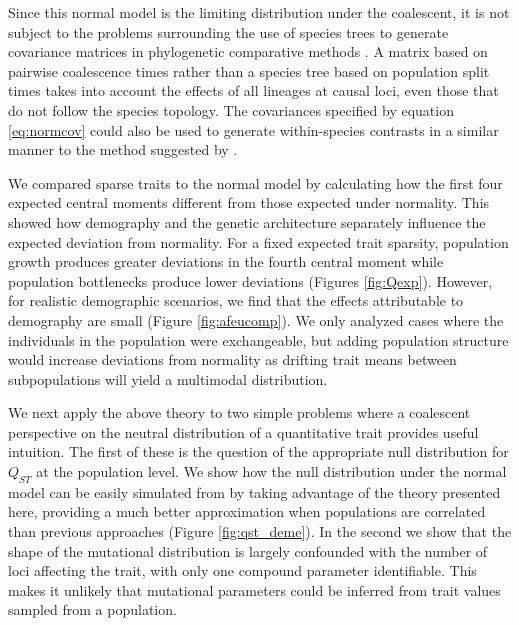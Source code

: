 Since this normal model is the limiting distribution under the coalescent, it is
not subject to the problems surrounding the use of species trees to generate
covariance matrices in phylogenetic comparative methods \citep{Mendes2018}. A
matrix based on pairwise coalescence times rather than a species tree based on
population split times takes into account the effects of all lineages at causal
loci, even those that do not follow the species topology. The covariances
specified by equation \eqref{eq:normcov} could also be used to generate
within-species contrasts in a similar manner to the method suggested
by \citet{Felsenstein2002}.

We compared sparse traits to the normal model by calculating how the first four
expected central moments different from those expected under normality. This
showed how demography and the genetic architecture separately influence the
expected deviation from normality. For a fixed expected trait sparsity,
population growth produces greater deviations in the fourth central moment while
population bottlenecks produce lower deviations (Figures
\ref{fig:Qexp}). However, for realistic demographic scenarios,
we find that the effects attributable to demography are small (Figure
\ref{fig:afeucomp}). We only analyzed cases where the individuals in the
population were exchangeable, but adding population structure would increase
deviations from normality as drifting trait means between subpopulations will
yield a multimodal distribution.

We next apply the above theory to two simple problems where a coalescent
perspective on the neutral distribution of a quantitative trait provides useful
intuition. The first of these is the question of the appropriate null
distribution for $Q_{ST}$ at the population level. We show how the null
distribution under the normal model can be easily simulated from by taking
advantage of the theory presented here, providing a much better approximation
when populations are correlated than previous approaches \citep{Whitlock2009}
(Figure \ref{fig:qst_deme}). In the second we show that the shape of the
mutational distribution is largely confounded with the number of loci affecting
the trait, with only one compound parameter identifiable. This makes it unlikely
that mutational parameters could be inferred from trait values sampled from a
population.

